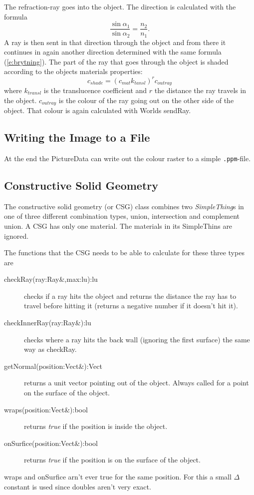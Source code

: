 			The refraction-ray goes into the object. The direction is calculated with the formula \cite{maol_sv}
			\begin{equation}\label{e:brytning}
				\frac{\sin \alpha_1}{\sin \alpha_2} = \frac{n_2}{n_1}.
			\end{equation}
			A ray is then sent in that direction through the object and from there it continues in again another direction determined with the same formula (\ref{e:brytning}). The part of the ray that goes through the object is shaded according to the objects materials properties:
			\begin{equation}
				c_{shade} = \left(c_{mat}k_{tansl}\right)^r c_{out ray}
			\end{equation}
			where $k_{transl}$ is the translucence coefficient and $r$ the distance the ray travels in the object. $c_{out ray}$ is the colour of the ray going out on the other side of the object. That colour is again calculated with Worlds sendRay.
		
	
	\subsection{Writing the Image to a File}
	
		At the end the PictureData can write out the colour raster to a simple \texttt{.ppm}-file.
	
	\subsection{Constructive Solid Geometry}
		
		The constructive solid geometry (or CSG) class combines two \emph{SimpleThing}s in one of three different combination types, union, intersection and complement union. A CSG has only one material. The materials in its SimpleThins are ignored. 

		The functions that the CSG needs to be able to calculate for these three types are
		\begin{description}
			\item[checkRay(ray:Ray\&,max:lu):lu] checks if a ray hits the object and returns the distance the ray has to travel before hitting it (returns a negative number if it doesn't hit it).
			\item[checkInnerRay(ray:Ray\&):lu] checks where a ray hits the back wall (ignoring the first surface) the same way as checkRay.
			\item[getNormal(position:Vect\&):Vect] returns a unit vector pointing out of the object. Always called for a point on the surface of the object.
			\item[wraps(position:Vect\&):bool] returns \emph{true} if the position is inside the object.
			\item[onSurfice(position:Vect\&):bool] returns \emph{true} if the position is on the surface of the object.
		\end{description}
		wraps and  onSurfice arn't ever true for the same position. For this a small $\Delta$ constant is used since doubles aren't very exact.
		
